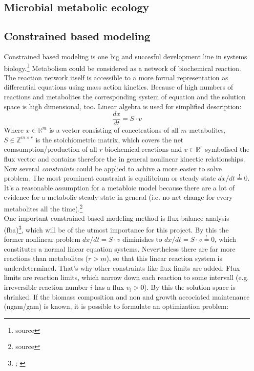 \subsection{Microbial metabolic ecology}

\subsection{Constrained based modeling}
Constrained based modeling is one big and succesful development line in systems biology.\footnote{source}
Metabolism could be considered as a network of biochemical reaction.
The reaction network itself is accessible to a more formal representation as differential equations using mass action kinetics.
Because of high numbers of reactions and metabolites the corresponding system of equation and the solution space is high dimensional, too.
Linear algebra is used for simplified description:
\[
  \frac{dx}{dt}=S \cdot v
\]
Where $x\in \mathbb{R}^m$ is a vector consisting of concetrations of all $m$ metabolites, $S\in \mathbb{Z}^{m\times r}$ is the stoichiometric matrix, which covers the net comsumption/production of all $r$ biochemical reactions and $v \in \mathbb{R}^r$ symbolised the flux vector and contains therefore the in general nonlinear kinectic relationships.\\
Now several \textit{constraints} could be applied to achive a more easier to solve problem.
The most prominent constraint is equilibrium or steady state $dx/dt \stackrel{!}{=}0$.
It's a reasonable assumption for a metabloic model because there are a lot of evidence for a metabolic steady state in general (i.e. no net change for every metabolites all the time).\footnote{source}\\
One important constrained based modeling method is flux balance analysis (fba)\footnote{\cite{Varma1994}; \cite{Orth2010}}, which will be of the utmost importance for this project.
By this the former nonlinear problem $dx/dt=S\cdot v$ diminishes to $dx/dt=S\cdot v \stackrel{!}{=}0$, which constitutes a normal linear equation systems.
Nevertheless there are far more reactions than metabolites ($r>m$), so that this linear reaction system is underdetermined.
That's why other constraints like flux limits are added.
Flux limits are reaction limits, which narrow down each reaction to some intervall (e.g. irreversible reaction number $i$ has a flux $v_i>0$).
By this the solution space is shrinked.
If the biomass composition and non and growth accociated maintenance (ngam/gam) is known, it is possible to formulate an optimization problem:
